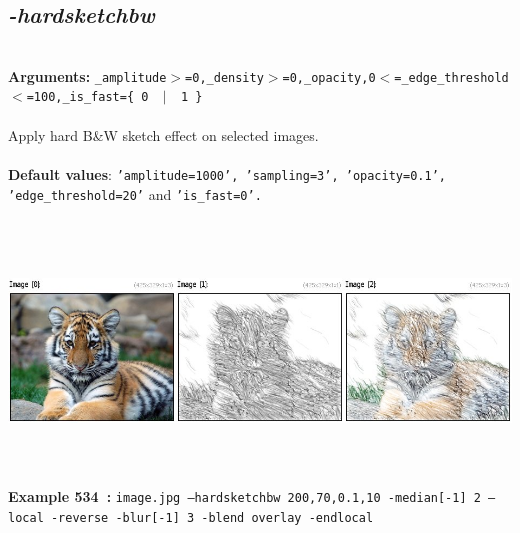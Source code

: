 \documentclass[a4paper,11pt,twoside]{book}
\begin{document}
\subsection{\emph{-hardsketchbw} }\vspace*{-0.5em}
~\\\textbf{Arguments: } 
{\small \texttt{\_amplitude$>$=0,\_density$>$=0,\_opacity,0$<$=\_edge\_threshold$<$=100,\_is\_fast=\{ 0 ~$|$~ 1 \}}}\\~\\
Apply hard B\&W sketch effect on selected images.
~\\~\\\textbf{Default values}: {\small \texttt{'amplitude=1000', 'sampling=3', 'opacity=0.1', 'edge\_threshold=20'} and \texttt{'is\_fast=0'.}}
\begin{center}\includegraphics[keepaspectratio=true,height=7cm,width=\textwidth]{img/gmic_def534.jpg}\\
{\footnotesize \textbf{Example 534~:} \texttt{image.jpg --hardsketchbw 200,70,0.1,10 -median[-1] 2 --local -reverse -blur[-1] 3 -blend overlay -endlocal}}
\end{center}
\end{document}
